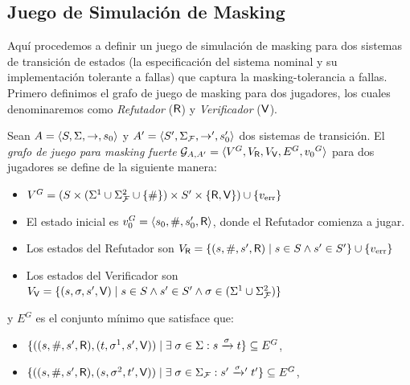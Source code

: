 \subsection{Juego de Simulación de Masking} \label{subsec:mask_sim_game}
Aquí procedemos a definir un juego de simulación de masking para dos sistemas de transición de estados (la especificación del sistema nominal y su implementación tolerante a fallas) que captura la masking-tolerancia a fallas. Primero definimos el grafo de juego de masking para dos jugadores, los cuales denominaremos como \emph{Refutador} ($\mathsf{R}$) y \emph{Verificador}
($\mathsf{V}$).

\begin{definition} \label{def:strong_masking_game_graph}
  Sean $A=\langle S, \Sigma, \rightarrow, s_0 \rangle$ y $A'=\langle S',
  \Sigma_{\mathcal{F}}, \rightarrow', s'_0 \rangle$ dos sistemas de transición.
  El \emph{grafo de juego para masking fuerte} 
  $\mathcal{G}_{A, A'} = \langle V^G, V_{\mathsf{R}}, V_{\mathsf{V}}, E^G, {v_0}^G \rangle$ 
  para dos jugadores se define de la siguiente manera:

\begin{itemize}
  \item $V^G = (S \times ( \Sigma^1 \cup \Sigma_{\mathcal{F}}^2 \cup\{\#\}) \times S' \times \{ \mathsf{R}, \mathsf{V} \}) 
  \cup \{v_{\text{err}}\}$
  \item El estado inicial es $v_0^G = \langle s_0, \#, s'_0, \mathsf{R} \rangle$, donde el Refutador comienza a jugar.
  \item Los estados del Refutador son $V_{\mathsf{R}} = \{ (s, \#, s', \mathsf{R}) \mid s \in S \wedge s' \in S' \} 
  \cup \{v_{\text{err}}\}$
  \item Los estados del Verificador son $V_{\mathsf{V}} = \{ (s, \sigma, s', \mathsf{V}) \mid s \in S \wedge s' \in S' \wedge \sigma \in ( \Sigma^1 \cup \Sigma_{\mathcal{F}}^2 )\}$
\end{itemize}
y $E^G$ es el conjunto mínimo que satisface que:
\begin{itemize}
  \item $\{ ( (s, \#, s', \mathsf{R}) , (t, \sigma^{1}, s', \mathsf{V})) \mid \exists\;\sigma \in \Sigma: s \xrightarrow{\sigma} t \} \subseteq E^G$,

  \item $\{ ((s, \#, s', \mathsf{R}), (s, \sigma^{2}, t', \mathsf{V}))  \mid \exists\;\sigma \in \Sigma_{\mathcal{F}}: s' \mathrel{{\xrightarrow[]{\sigma}}{}'} t' \} \subseteq E^G$,


\end{itemize}
\end{definition}
